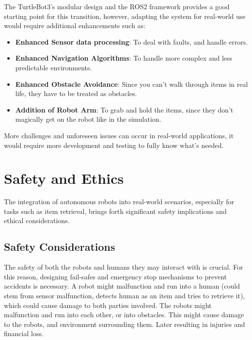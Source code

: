 \documentclass[conference]{IEEEtran}
\begin{document}
The TurtleBot3's modular design and the ROS2 framework provides a good starting point for this transition, however, adapting the system for real-world use would require additional enhancements such as:

\begin{itemize}
    \item \textbf{Enhanced Sensor data processing}: To deal with faults, and handle errors.
    \item \textbf{Enhanced Navigation Algorithms}: To handle more complex and less predictable environments.
    \item \textbf{Enhanced Obstacle Avoidance}: Since you can't walk through items in real life, they have to be treated as obstacles.
    \item \textbf{Addition of Robot Arm}: To grab and hold the items, since they don't magically get on the robot like in the simulation.
\end{itemize}

More challenges and unforeseen issues can occur in real-world applications, it would require more development and testing to fully know what's needed.

\section{Safety and Ethics}
The integration of autonomous robots into real-world scenarios, especially for tasks such as item retrieval, brings forth significant safety implications and ethical considerations.

\subsection{Safety Considerations}
The safety of both the robots and humans they may interact with is crucial. For this reason, designing fail-safes and emergency stop mechanisms to prevent accidents is necessary. 
A robot might malfunction and run into a human (could stem from sensor malfunction, detects human as an item and tries to retrieve it), which could cause damage to both parties involved.
The robots might malfunction and run into each other, or into obstacles. This might cause damage to the robots, and environment surrounding them. Later resulting in injuries and financial loss.  
\end{document}
